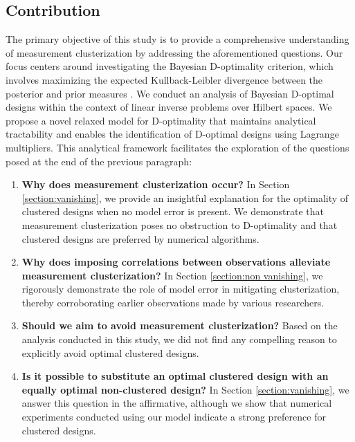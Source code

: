 \subsection{Contribution}
The primary objective of this study is to provide a comprehensive
understanding of measurement clusterization by addressing the
aforementioned questions. Our focus centers around investigating the
Bayesian D-optimality criterion, which involves maximizing the
expected Kullback-Leibler divergence between the posterior and prior
measures \cite{CoverThomas91, Chaloner1995}. We conduct an analysis of
Bayesian D-optimal designs within the context of linear inverse
problems over Hilbert spaces. We propose a novel relaxed model for
D-optimality that maintains analytical tractability and enables the
identification of D-optimal designs using Lagrange multipliers. This
analytical framework facilitates the exploration of the questions
posed at the end of the previous paragraph:


\begin{enumerate}
\item \label{q:why} \textbf{Why does measurement clusterization
  occur?} In Section \ref{section:vanishing}, we provide an insightful
  explanation for the optimality of clustered designs when no model
  error is present. We demonstrate that measurement clusterization
  poses no obstruction to D-optimality and that clustered designs are
  preferred by numerical algorithms.


\item \label{q:mitigate} \textbf{Why does imposing correlations
  between observations alleviate measurement clusterization?} In
  Section \ref{section:non vanishing}, we rigorously demonstrate the
  role of model error in mitigating clusterization, thereby
  corroborating earlier observations made by various researchers.

\item \label{q:avoid} \textbf{Should we aim to avoid measurement
  clusterization?} Based on the analysis conducted in this study, we
  did not find any compelling reason to explicitly avoid optimal
  clustered designs.

\item \label{q:replace} \textbf{Is it possible to substitute an
  optimal clustered design with an equally optimal non-clustered
  design?} In Section \ref{section:vanishing}, we answer this question
  in the affirmative, although we show that numerical experiments
  conducted using our model indicate a strong preference for clustered
  designs.
\end{enumerate}

